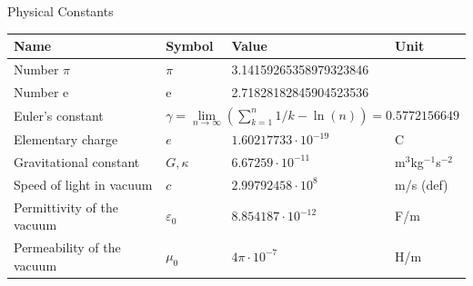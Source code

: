 \documentclass[10pt]{beamer}
\begin{document}
\begin{frame}[shrink=40]{Physical Constants}


\begin{center}
\begin{tabular}{||l|lll||} 
\hline
{\bf Name}&{\bf Symbol}&{\bf Value}&{\bf Unit}\\
\hline
\hline
Number $\pi$                 &$\pi$&3.14159265358979323846&\\
Number e                     &e    &2.71828182845904523536&\\
Euler's constant &\multicolumn{3}{|l||}{$\gamma=\lim\limits_{n\rightarrow\infty}\left(\sum\limits_{k=1}^n 1/k-\ln(n)\right)=0.5772156649$}\\
\hline
Elementary charge            &$e$&$1.60217733\cdot10^{-19}$&C\rule{0pt}{13pt}\\
Gravitational constant       &$G,\kappa$&$6.67259\cdot10^{-11}$&m$^3$kg$^{-1}$s$^{-2}$\\
Speed of light in vacuum     &$c$&$2.99792458\cdot10^8$&m/s (def)\\
Permittivity of the vacuum   &$\varepsilon_0$&$8.854187\cdot10^{-12}$&F/m\\
Permeability of the vacuum   &$\mu_0$&$4\pi\cdot10^{-7}$&H/m\\
\hline

\end{tabular}
\end{center}
\end{frame}
\end{document}
